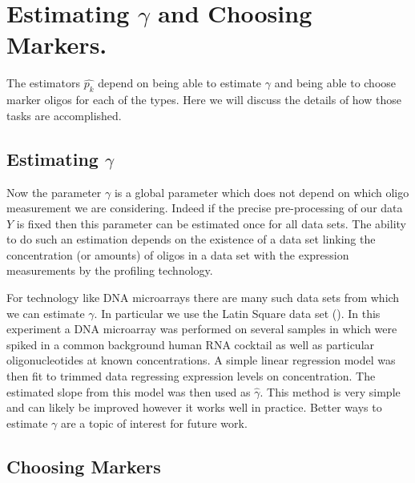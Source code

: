 \documentclass[reqno,12pt,oneside]{report}\usepackage[]{graphicx}\usepackage[]{color}
\theoremstyle{plain}
\theoremstyle{definition}
\theoremstyle{remark}
\numberwithin{theorem}{chapter}     %
\begin{document}
\section{Estimating $\gamma$ and Choosing Markers.}

The estimators $\widehat{p_k}$ depend on being able to estimate $\gamma$ and being able to choose marker oligos for each of the types. Here we will discuss the details of how those tasks are accomplished. 
  
\subsection{Estimating $\gamma$}
  
Now the parameter $\gamma$ is a global parameter which does not depend on which oligo measurement we are considering. Indeed if the precise pre-processing of our data $Y$ is fixed then this parameter can be estimated once for all data sets. The ability to do such an estimation depends on the existence of a data set linking the concentration (or amounts) of oligos in a data set with the expression measurements by the profiling technology. 

For technology like DNA microarrays there are many such data sets from which we can estimate $\gamma$. In particular we use the Latin Square data set (\cite{latin}). In this experiment a DNA microarray was performed on several samples in which were spiked in a common background human RNA cocktail as well as particular oligonucleotides at known concentrations. A simple linear regression model was then fit to trimmed data regressing expression levels on concentration. The estimated slope from this model was then used as $\widehat{\gamma}$. This method is very simple and can likely be improved however it works well in practice. Better ways to estimate $\gamma$ are a topic of interest for future work. 

\subsection{Choosing Markers}
\end{document}
